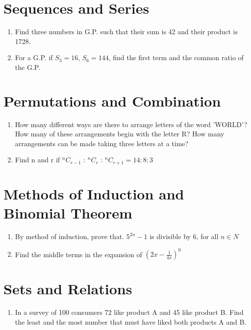 \documentclass[14pt]{article}
\begin{document}
\begin{multicols}{2}
\section{Sequences and Series}
\noindent
\begin{enumerate}
\item Find three numbers in G.P. such that their
sum is 42 and their product is 1728.

\item For a G.P. if $S_3 = 16$, $S_6 =144$, find  the first
term and the common ratio of the G.P.



\end{enumerate} 

\section{Permutations and Combination}
\noindent
\begin{enumerate}
\item How many different ways are there to
arrange letters of the word 'WORLD'? How many
of these arrangements begin with the letter R?
How many arrangements can be made taking
three letters at a time?

\item Find n and r
	if $^nC_{r-1}$ : $^nC_r$ : $^nC_{r+1} = 14:8:3$

\end{enumerate} 


\section{Methods of Induction and Binomial Theorem}
\noindent
\begin{enumerate}
\item By method of induction, prove that.
	$5^{2n} - 1$ is divisible by 6, for all $n \in N$
	
\item Find the middle terms in the expansion of $\left(2x - \frac{1}{4x}\right)^9$

\end{enumerate} 

\section{Sets and Relations}
\noindent
\begin{enumerate}
\item In a survey of 100 consumers 72
like product A and 45 like product B. Find the
least and the most number that must have liked
both products A and B.


\end{enumerate}
\end{multicols}
\end{document}
